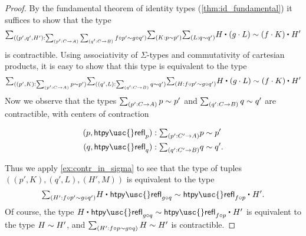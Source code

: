 \begin{comment}
\begin{rmk}
The homotopy $M$ is a homotopy of homotopies, and for each $z:C$ the identification $M(z)$ witnesses that the square of identifications
\begin{equation*}
\begin{tikzcd}[column sep=huge]
f(p(z)) \arrow[r,equals,"\ap{f}{K(z)}"] \arrow[d,equals,swap,"H(z)"] & f(p'(z)) \arrow[d,equals,"{H'(z)}"] \\
g(q(z)) \arrow[r,equals,swap,"\ap{g}{L(z)}"] & g(q'(z))
\end{tikzcd}
\end{equation*}
commutes. 
\end{rmk}
\end{comment}

\begin{proof}
By the fundamental theorem of identity types (\cref{thm:id_fundamental}) it suffices to show that the type
\begin{equation*}
  \sm{(p',q',H'):\sm{p':C\to A}{q':C\to B}f\circ p'\htpy g \circ q'}{K:p\htpy p'}{L:q\htpy q'} \ct{H}{(g\cdot L)} \htpy \ct{(f\cdot K)}{H'}
\end{equation*}
is contractible. Using associativity of $\Sigma$-types and commutativity of cartesian products, it is easy to show that this type is equivalent to the type
\begin{equation*}
  \sm{(p',K):\sm{p':C\to A}p\htpy p'}\sm{(q',L):\sm{q':C\to B}q\htpy q'}\sm{H:f\circ p'\htpy g \circ q'}\ct{H}{(g\cdot L)} \htpy \ct{(f\cdot K)}{H'}
\end{equation*}
Now we observe that the types $\sm{p':C\to A}p\htpy p'$ and $\sm{q':C\to B}q\htpy q'$ are contractible, with centers of contraction
\begin{samepage}
\begin{align*}
(p,\mathsf{htpy\usc{}refl}_p) & : \sm{p':C'\to A} p\htpy p' \\
(q,\mathsf{htpy\usc{}refl}_q) & : \sm{q':C'\to B} q\htpy q'.
\end{align*}%
\end{samepage}%
Thus we apply \cref{ex:contr_in_sigma} to see that the type of tuples $((p',K),(q',L),(H',M))$ is equivalent to the type
\begin{equation*}
\sm{H':f\circ p'\htpy g\circ q'} \ct{H}{\mathsf{htpy\usc{}refl}_{g\circ q}}\htpy \ct{\mathsf{htpy\usc{}refl}_{f\circ p}}{H'}.
\end{equation*}
Of course, the type $\ct{H}{\mathsf{htpy\usc{}refl}_{g\circ q}}\htpy \ct{\mathsf{htpy\usc{}refl}_{f\circ p}}{H'}$ is equivalent to the type $H\sim H'$, and $\sm{H':f\circ p\htpy g\circ q} H\htpy H'$ is contractible.
\end{proof}

